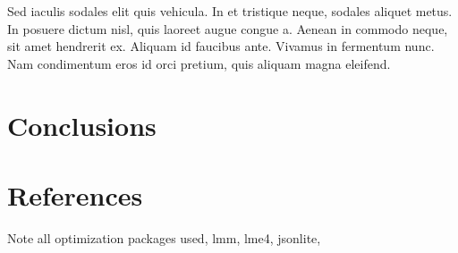 \documentclass[article]{jss}
\begin{document}
 Sed iaculis sodales elit quis vehicula. In et tristique neque, sodales aliquet metus. In posuere dictum nisl, quis laoreet augue congue a. Aenean in commodo neque, sit amet hendrerit ex. Aliquam id faucibus ante. Vivamus in fermentum nunc. Nam condimentum eros id orci pretium, quis aliquam magna eleifend. 

\section[Conclusions]{Conclusions}

\section[References]{References}

Note all optimization packages used, lmm, lme4, jsonlite, 
\end{document}

